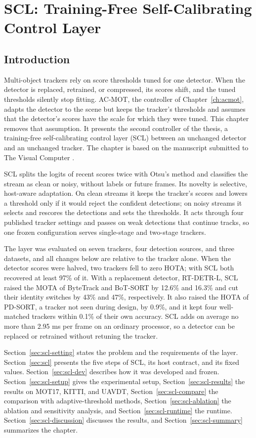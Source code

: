 \chapter{SCL: Training-Free Self-Calibrating Control Layer}\label{ch:scl}

\section{Introduction}\label{sec:scl-intro}
Multi-object trackers rely on score thresholds tuned for one detector. When the detector is replaced, retrained, or compressed, its scores shift, and the tuned thresholds silently stop fitting. AC-MOT, the controller of Chapter~\ref{ch:acmot}, adapts the detector to the scene but keeps the tracker's thresholds and assumes that the detector's scores have the scale for which they were tuned. This chapter removes that assumption. It presents the second controller of the thesis, a training-free self-calibrating control layer (SCL) between an unchanged detector and an unchanged tracker. The chapter is based on the manuscript submitted to The Visual Computer \cite{ismail2026scl}.

SCL splits the logits of recent scores twice with Otsu's method and classifies the stream as clean or noisy, without labels or future frames. Its novelty is selective, host-aware adaptation. On clean streams it keeps the tracker's scores and lowers a threshold only if it would reject the confident detections; on noisy streams it selects and rescores the detections and sets the thresholds. It acts through four published tracker settings and passes on weak detections that continue tracks, so one frozen configuration serves single-stage and two-stage trackers.

The layer was evaluated on seven trackers, four detection sources, and three datasets, and all changes below are relative to the tracker alone. When the detector scores were halved, two trackers fell to zero HOTA; with SCL both recovered at least 97\% of it. With a replacement detector, RT-DETR-L, SCL raised the MOTA of ByteTrack and BoT-SORT by 12.6\% and 16.3\% and cut their identity switches by 43\% and 47\%, respectively. It also raised the HOTA of PD-SORT, a tracker not seen during design, by 0.9\%, and it kept four well-matched trackers within 0.1\% of their own accuracy. SCL adds on average no more than 2.95 ms per frame on an ordinary processor, so a detector can be replaced or retrained without retuning the tracker.

Section~\ref{sec:scl-setting} states the problem and the requirements of the layer. Section~\ref{sec:scl} presents the five steps of SCL, its host contract, and its fixed values. Section~\ref{sec:scl-dev} describes how it was developed and frozen. Section~\ref{sec:scl-setup} gives the experimental setup, Section~\ref{sec:scl-results} the results on MOT17, KITTI, and UAVDT, Section~\ref{sec:scl-compare} the comparison with adaptive-threshold methods, Section~\ref{sec:scl-ablation} the ablation and sensitivity analysis, and Section~\ref{sec:scl-runtime} the runtime. Section~\ref{sec:scl-discussion} discusses the results, and Section~\ref{sec:scl-summary} summarizes the chapter.

